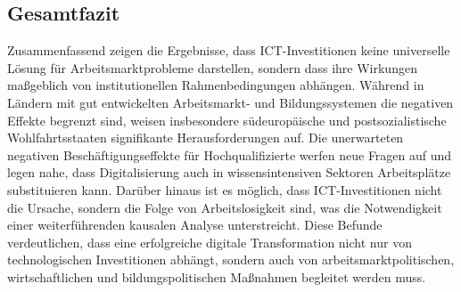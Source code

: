 \subsection{Gesamtfazit}

Zusammenfassend zeigen die Ergebnisse, dass \ac{ICT}-Investitionen keine universelle 
Lösung für Arbeitsmarktprobleme darstellen, sondern dass ihre Wirkungen maßgeblich von 
institutionellen Rahmenbedingungen abhängen. Während in Ländern mit gut entwickelten 
Arbeitsmarkt- und Bildungssystemen die negativen Effekte begrenzt sind, weisen insbesondere 
südeuropäische und postsozialistische Wohlfahrtsstaaten signifikante Herausforderungen auf.
Die unerwarteten negativen Beschäftigungseffekte für Hochqualifizierte werfen neue Fragen 
auf und legen nahe, dass Digitalisierung auch in wissensintensiven Sektoren Arbeitsplätze 
substituieren kann. Darüber hinaus ist es möglich, dass ICT-Investitionen nicht die Ursache, 
sondern die Folge von Arbeitslosigkeit sind, was die Notwendigkeit einer weiterführenden 
kausalen Analyse unterstreicht. Diese Befunde verdeutlichen, dass eine erfolgreiche digitale 
Transformation nicht nur von technologischen Investitionen abhängt, sondern auch von 
arbeitsmarktpolitischen, wirtschaftlichen und bildungspolitischen Maßnahmen begleitet werden muss.
